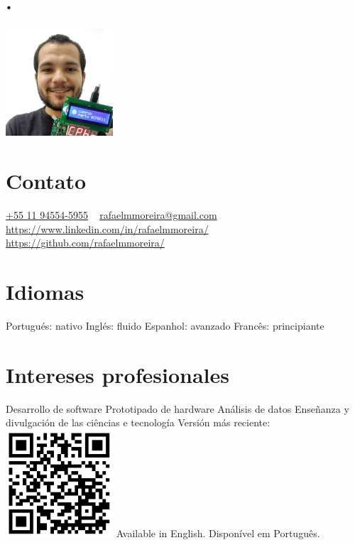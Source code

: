 \documentclass[espanol]{cv-style}          %
\begin{document}
\lastupdated


\begin{aside}
\section{.}
\flushleft%
\includegraphics[width=4cm]{photo}
\section{Contato}
\href{https://wa.me/5511945545955}{+55 11 94554-5955}
~
\href{mailto:rafaelmmoreira@gmail.com}{rafaelmmoreira@gmail.com}
~
\url{https://www.linkedin.com/in/rafaelmmoreira/}
~
\url{https://github.com/rafaelmmoreira/}
%
\section{Idiomas}
Portugués: nativo
Inglés: fluido
Espanhol: avanzado
Francês: principiante
%
\section{Intereses profesionales}
Desarrollo de software
Prototipado de hardware
Análisis de datos
Enseñanza y divulgación de las ciências e tecnología
%
\vspace{3.7cm}
Versión más reciente:
\includegraphics[width=4cm]{qrcode}
Available in English.
Disponível em Português.
%
\end{aside}
\end{document}
